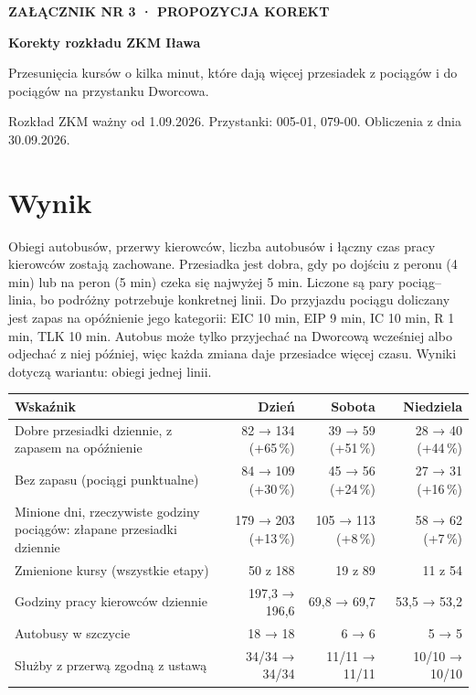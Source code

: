 \documentclass[10pt,a4paper]{article}
\newcommand{\mut}[1]{\textcolor{muted}{#1}}
\begin{document}
{\sffamily\footnotesize\bfseries\MakeUppercase{Załącznik nr 3 · propozycja korekt}}\par\smallskip
{\sffamily\LARGE\bfseries Korekty rozkładu ZKM Iława}\par\medskip
{\large Przesunięcia kursów o kilka minut, które dają więcej przesiadek z pociągów i do pociągów na przystanku Dworcowa.}\par\medskip
{\small\mut{Rozkład ZKM ważny od 1.09.2026. Przystanki: 005-01, 079-00. Obliczenia z dnia 30.09.2026.}}\par\bigskip
\section*{Wynik}
Obiegi autobusów, przerwy kierowców, liczba autobusów i łączny czas pracy kierowców zostają zachowane. Przesiadka jest dobra, gdy po dojściu z peronu (4 min) lub na peron (5 min) czeka się najwyżej 5 min. Liczone są pary pociąg--linia, bo podróżny potrzebuje konkretnej linii. Do przyjazdu pociągu doliczany jest zapas na opóźnienie jego kategorii: EIC 10 min, EIP 9 min, IC 10 min, R 1 min, TLK 10 min. Autobus może tylko przyjechać na Dworcową wcześniej albo odjechać z niej później, więc każda zmiana daje przesiadce więcej czasu. Wyniki dotyczą wariantu: obiegi jednej linii.
{\footnotesize
\begin{center}\begin{tabular}{@{}p{5.4cm} r r r@{}}\toprule
Wskaźnik & Dzień & Sobota & Niedziela \\ \midrule
Dobre przesiadki dziennie, z zapasem na opóźnienie & 82 → 134 \mut{(+65\,\%)} & 39 → 59 \mut{(+51\,\%)} & 28 → 40 \mut{(+44\,\%)} \\
Bez zapasu (pociągi punktualne) & 84 → 109 \mut{(+30\,\%)} & 45 → 56 \mut{(+24\,\%)} & 27 → 31 \mut{(+16\,\%)} \\
Minione dni, rzeczywiste godziny pociągów: złapane przesiadki dziennie & 179 → 203 \mut{(+13\,\%)} & 105 → 113 \mut{(+8\,\%)} & 58 → 62 \mut{(+7\,\%)} \\
Zmienione kursy (wszystkie etapy) & 50 z 188 & 19 z 89 & 11 z 54 \\
Godziny pracy kierowców dziennie & 197,3 → 196,6 & 69,8 → 69,7 & 53,5 → 53,2 \\
Autobusy w szczycie & 18 → 18 & 6 → 6 & 5 → 5 \\
Służby z przerwą zgodną z ustawą & 34/34 → 34/34 & 11/11 → 11/11 & 10/10 → 10/10 \\
\bottomrule\end{tabular}\end{center}}
\end{document}
